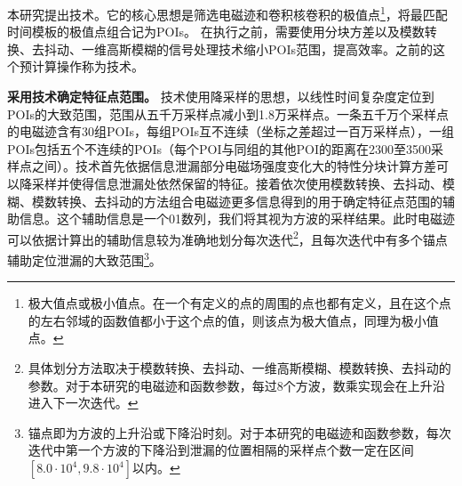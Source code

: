 {{	本研究提出\yuchuli 技术。它的核心思想是筛选电磁迹和卷积核卷积的极值点\footnote{极大值点或极小值点。在一个有定义的点的周围的点也都有定义，且在这个点的左右邻域的函数值都小于这个点的值，则该点为极大值点，同理为极小值点。}，将最匹配时间模板的极值点组合记为POIs。
%	
	在执行\yuchuli 之前，需要使用分块方差以及模数转换、去抖动、一维高斯模糊的信号处理技术缩小POIs范围，提高\yuchuli 效率。\yuchuli 之前的这个预计算操作称为\poifanwei 技术。
	
	

	\textbf{采用\poifanwei 技术确定特征点范围。}	
	\poifanwei 技术使用降采样的思想，以线性时间复杂度定位到POIs的大致范围，范围从五千万采样点减小到1.8万采样点。一条五千万个采样点的电磁迹含有30组POIs，每组POIs互不连续（坐标之差超过一百万采样点），一组POIs包括五个不连续的POIs（每个POI与同组的其他POI的距离在2300至3500采样点之间）。\poifanwei 技术首先依据信息泄漏部分电磁场强度变化大的特性分块计算方差可以降采样并使得信息泄漏处依然保留的特征。接着依次使用模数转换、去抖动、模糊、模数转换、去抖动的方法组合电磁迹更多信息得到的用于确定特征点范围的辅助信息。这个辅助信息是一个01数列，我们将其视为方波的采样结果。此时电磁迹可以依据计算出的辅助信息较为准确地划分每次迭代\footnote{具体划分方法取决于模数转换、去抖动、一维高斯模糊、模数转换、去抖动的参数。对于本研究的电磁迹和函数参数，每过8个方波，数乘实现会在上升沿进入下一次迭代。}，且每次迭代中有多个锚点辅助定位泄漏的大致范围\footnote{锚点即为方波的上升沿或下降沿时刻。对于本研究的电磁迹和函数参数，每次迭代中第一个方波的下降沿到泄漏的位置相隔的采样点个数一定在区间$[8.0\cdot10^{4},9.8\cdot10^{4}]$以内。}。
	
}}
